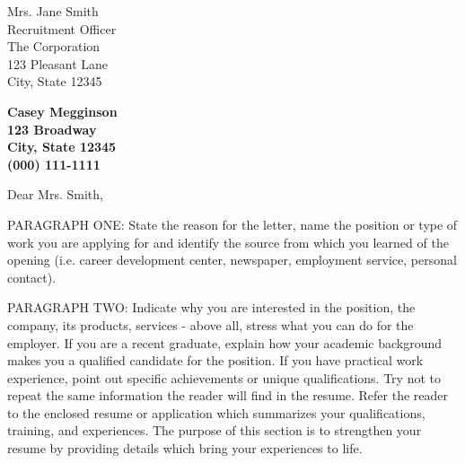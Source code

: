 \documentclass[11pt]{letter}
\begin{document}

\begin{letter}{Mrs. Jane Smith \\
Recruitment Officer \\
The Corporation \\
123 Pleasant Lane \\
City, State 12345}


\begin{center}
  \large\bf Casey Megginson \\ %
  123 Broadway \\ City, State 12345 \\ (000) 111-1111
\end{center}

\signature{Casey Megginson}


\opening{Dear Mrs. Smith,}

PARAGRAPH ONE: State the reason for the letter, name the position or type of
work you are applying for and identify the source from which you learned of the
opening (i.e. career development center, newspaper, employment service, personal
contact).

PARAGRAPH TWO: Indicate why you are interested in the position, the company, its
products, services - above all, stress what you can do for the employer. If you
are a recent graduate, explain how your academic background makes you a
qualified candidate for the position. If you have practical work experience,
point out specific achievements or unique qualifications. Try not to repeat the
same information the reader will find in the resume. Refer the reader to the
enclosed resume or application which summarizes your qualifications, training,
and experiences. The purpose of this section is to strengthen your resume by
providing details which bring your experiences to life.


\end{letter}
\end{document}
